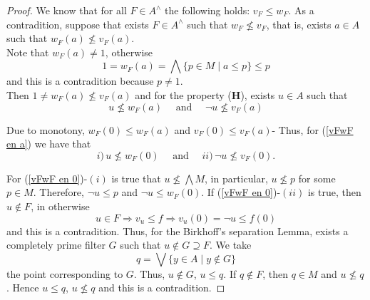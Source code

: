 \documentclass[11pt]{amsart}
\theoremstyle{plain}
\theoremstyle{definition}
\begin{document}
\begin{proof}
  We know that for all $F\in A^\wedge$ the following holds: $v_F\leq w_F$. As a contradition, suppose that exists $F\in A^\wedge$ such that $w_F\nleq v_F$, that is, exists $a\in A$ such that $w_F(a)\nleq v_F(a)$.\\

  Note that $w_F(a)\neq 1$, otherwise 
  \[
  1=w_F(a)=\bigwedge \{p\in M\mid a\leq p\}\leq p
  \]
  and this is a contradition because $p\neq 1$.\\

Then $1\neq w_F(a)\nleq v_F(a)$ and for the property ($\mathbf{H}$), exists $u\in A$ such that
\begin{equation}\label{vFwF en a}
u\nleq w_F(a)\quad \mbox{ and }\quad \neg u \nleq v_F(a)
\end{equation}

 Due to monotony, $w_F(0)\leq w_F(a)$ and $v_F(0)\leq v_F(a)$- Thus, for (\ref{vFwF en a}) we have that
\begin{equation}\label{vFwF en 0}
i)\,u\nleq w_F(0)\quad \mbox{ and }\quad ii)\,\neg u\nleq v_F(0).
\end{equation}

For (\ref{vFwF en 0})-$(i)$ is true that $u\nleq \bigwedge M$, in particular, $u\nleq p$ for some $p\in M$. Therefore, $\neg u\leq p$ and $\neg u\leq w_F(0)$. If (\ref{vFwF en 0})-$(ii)$ is true, then $u\notin F$, in otherwise 
\[
u\in F\Rightarrow v_u\leq f \Rightarrow v_u(0)=\neg u\leq f(0)
\] 
and this is a contradition. Thus, for the Birkhoff's separation Lemma, exists a completely prime filter $G$ such that $u\notin G\supseteq F$. We take
\[
q=\bigvee \{y\in A\mid y\notin G\}
\]
the point corresponding to $G$. Thus, $u\notin G$, $u\leq q$. If $q\notin F$, then $q\in M$ and $u\nleq q$. Hence $u\leq q$, $u\nleq q$ and this is a contradition.
\end{proof}

\end{document}
